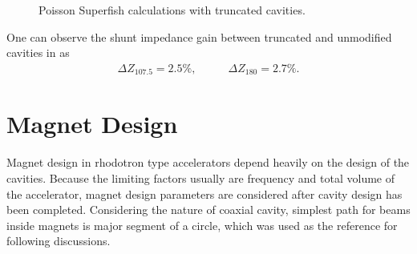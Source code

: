 \documentclass[a4paper,oneside,12pt]{report}
\numberwithin{equation}{chapter}
\begin{document}
\begin{figure}[H]
    \centering
    \vspace{5pt}
    \vspace{5pt}
    \caption{\centering Poisson Superfish calculations with truncated cavities.} 
    \label{fig:180_cavity_shunt_diff}
\end{figure}

\vspace{-10pt}
One can observe the shunt impedance gain between truncated and unmodified cavities in  as
\vspace{-22pt}\begin{equation}
    \begin{aligned}
        \Delta Z_{107.5}=2.5\%   ,
    \end{aligned}
    \qquad
    \begin{aligned}
        \Delta Z_{180}=2.7\% .
    \end{aligned}
\end{equation}


\section{Magnet Design} \label{sec:magnet_design}
Magnet design in rhodotron type accelerators depend heavily on the design of the cavities.
Because the limiting factors usually are frequency and total volume of the accelerator, magnet design parameters are considered after cavity design has been completed.
Considering the nature of coaxial cavity, simplest path for beams inside magnets is major segment of a circle, which was used as the reference for following discussions.
\end{document}
